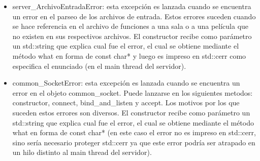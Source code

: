 \documentclass[a4paper,12pt]{report}
\begin{document}
\begin{itemize}

\item server\_ArchivoEntradaError: esta excepci\'on es lanzada cuando se encuentra un error en el parseo de los archivos de entrada. Estos errores suceden cuando se hace referencia en el archivo de funciones a una sala o a una pel\'icula que no existen en sus respectivos archivos. El constructor recibe como par\'ametro un std::string que explica cual fue el error, el cual se obtiene mediante el m\'etodo what en forma de const char* y luego es impreso en std::cerr como especifica el enunciado (en el main thread del servidor).

\item common\_SocketError: esta excepci\'on es lanzada cuando se encuentra un error en el objeto common\_socket. Puede lanzarse en los siguientes metodos: constructor, connect, bind\_and\_listen y accept. Los motivos por los que suceden estos errores son diversos. El constructor recibe como par\'ametro un std::string que explica cual fue el error, el cual se obtiene mediante el m\'etodo what en forma de const char* (en este caso el error no es impreso en std::cerr, sino sería necesario proteger std::cerr ya que este error podr\'ia ser atrapado en un hilo distinto al main thread del servidor).

\end{itemize}
\end{document}
